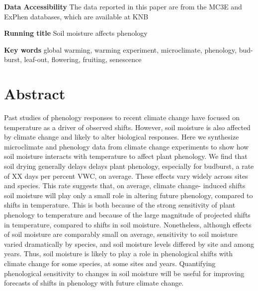 \documentclass{article}
\begin{document}
\begin{singlespace}
\textbf{Data Accessibility} %
The data reported in this paper are from the MC3E and ExPhen databases, which are available at KNB \citep{ettinger2018,ettinger2019}

\textbf{Running title} Soil moisture affects phenology


\textbf{Key words} global warming, warming experiment, microclimate, phenology, bud-burst, leaf-out, flowering, fruiting, senescence 
\end{singlespace}


\clearpage
\section*{Abstract}
Past studies of phenology responses to recent climate change have focused on temperature as a driver of observed shifts. However, soil moisture is also affected by climate change and likely to alter biological responses. Here we synthesize microclimate and phenology data from climate change experiments to show how soil moisture interacts with temperature to affect plant phenology. We find that soil drying generally delays delays plant phenology, especially for budburst, a rate of XX days per percent VWC, on average. These effects vary widely across sites and species. This rate suggests that, on average, climate change- induced shifts soil moisture will play only a small role in altering future phenology, compared to shifts in temperature. This is both because of the strong sensitivity of plant phenology to temperature and because of the large magnitude of projected shifts in temperature, compared to shifts in soil moisture. Nonetheless, although effects of soil moisture are comparably small on average, sensitivity to soil moisture varied dramatically by species, and soil moisture levels differed by site and among years. Thus, soil moisture is likely to play a role in phenological shifts with climate change for some species, at some sites and years. Quantifying phenological sensitivity to changes in soil moisture will be useful for improving forecasts of shifts in phenology with future climate change.  
\end{document}
